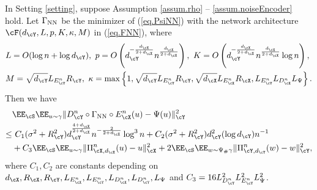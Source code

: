 \documentclass[11pt]{article} %
\newcommand{\hao}[1]{{\color{blue} #1}}
\begin{document}
\begin{theorem}\label{thm.general}
	In Setting \ref{setting},
	suppose Assumption \ref{assum.rho} -- \ref{assum.noiseEncoder} hold. Let $\Gamma_{\rm NN}$ be the minimizer of (\ref{eq.PsiNN}) with the network architecture $\cF(d_{\cY},L,p,K,\kappa,M)$ in (\ref{eq.FNN}),  where
	\begin{equation}
		\begin{aligned}
			&L=O(\log n+\log d_{\cY}), \ p=O\left(d_{\cY}^{-\frac{d_{\cX}}{2+d_{\cX}}}n^{\frac{d_{\cX}}{2+d_{\cX}}}\right),\ K=O\left(d_{\cY}^{-\frac{d_{\cX}}{2+d_{\cX}}}n^{\frac{d_{\cX}}{2+d_{\cX}}}\log n\right), \\
			& M=\sqrt{d_{\cY}}L_{E^n_{\cY}}R_{\cY},\ \kappa=\max\left\{1,\sqrt{d_{\cY}}L_{E^n_{\cY}}R_{\cY}, \sqrt{d_{\cX}}L_{E^n_{\cX}}R_{\cX},L_{E^n_{\cY}}L_{D^n_{\cX}}L_{\Psi} \right\}.
		\end{aligned}\label{eq.NN.parameter.n}
	\end{equation}	
	  Then we have
	  \begin{align}
	  	&\EE_{\cS}\EE_{u\sim \gamma}\|D_{\cY}^n\circ \Gamma_{\rm NN} \circ E_{\cX}^n(u)- \Psi(u)\|_{\cY}^2 \nonumber \\ 
	  	\leq &\ C_1(\sigma^2+R_{\cY}^2)d_{\cY}^{\frac{4+d_{\cX}}{2+d_{\cX}}}n^{-\frac{2}{2+d_{\cX}}}\log^3 n +C_2(\sigma^2+R_{\cY}^2)d_{\cY}^2(\log d_{\cY})n^{-1}\nonumber \\
	  	& + C_3\EE_{\cS}\EE_{u\sim \gamma}\| \Pi_{\cX,d_{\cX}}^n(u)- u\|_{\cX}^2+2\EE_{\cS}\EE_{w\sim \Psi_{\#}\gamma}\|\Pi_{\cY,d_{\cY}}^n(w)- w\|_{\cY}^2,
	  	\label{eq.error.general}
	  \end{align}
where $C_1,C_2$ are constants depending on $d_{\cX},R_{\cX}, R_{\cY},L_{E^n_{\cX}}, L_{E^n_{\cY}},L_{D^n_{\cX}},L_{D^n_{\cY}},L_{\Psi}$ and $C_3=16L_{D^n_{\cY}}^2L_{E^n_{\cY}}^2L_{\Psi}^2$.
\end{theorem}
\end{document}
